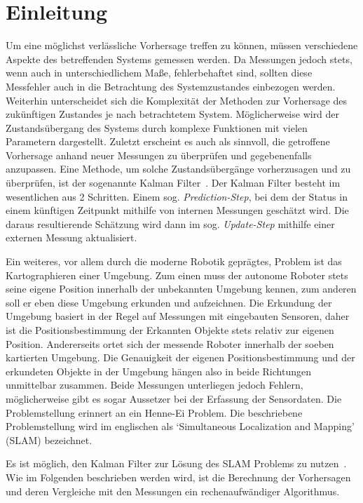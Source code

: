 \documentclass[11pt]{article}
\begin{document}
\section{Einleitung}\label{Einleitung}
Um eine möglichst verlässliche Vorhersage treffen zu können, müssen verschiedene Aspekte des betreffenden Systems gemessen werden. Da Messungen jedoch stets, wenn auch in unterschiedlichem Maße, fehlerbehaftet sind, sollten diese Messfehler auch in die Betrachtung des Systemzustandes einbezogen werden. Weiterhin unterscheidet sich die Komplexität der Methoden zur Vorhersage des zukünftigen Zustandes je nach betrachtetem System. Möglicherweise wird der Zustandsübergang des Systems durch komplexe Funktionen mit vielen Parametern dargestellt. Zuletzt erscheint es auch als sinnvoll, die getroffene Vorhersage anhand neuer Messungen zu überprüfen und gegebenenfalls anzupassen. Eine Methode, um solche Zustandsübergänge vorherzusagen und zu überprüfen, ist der sogenannte Kalman Filter~\cite{kalman1960new}. Der Kalman Filter besteht im wesentlichen aus 2 Schritten. Einem sog. \textit{Prediction-Step}, bei dem der Status in einem künftigen Zeitpunkt mithilfe von internen Messungen geschätzt wird. Die daraus resultierende Schätzung wird dann im sog. \textit{Update-Step} mithilfe einer externen Messung aktualisiert.

Ein weiteres, vor allem durch die moderne Robotik geprägtes, Problem ist das Kartographieren einer Umgebung. Zum einen muss der autonome Roboter stets seine eigene Position innerhalb der unbekannten Umgebung kennen, zum anderen soll er eben diese Umgebung erkunden und aufzeichnen. Die Erkundung der Umgebung basiert in der Regel auf Messungen mit eingebauten Sensoren, daher ist die Positionsbestimmung der Erkannten Objekte stets relativ zur eigenen Position. Andererseits ortet sich der messende Roboter innerhalb der soeben kartierten Umgebung. Die Genauigkeit der eigenen Positionsbestimmung und der erkundeten Objekte in der Umgebung hängen also in beide Richtungen unmittelbar zusammen. Beide Messungen unterliegen jedoch Fehlern, möglicherweise gibt es sogar Aussetzer bei der Erfassung der Sensordaten. Die Problemstellung erinnert an ein Henne-Ei Problem. Die beschriebene Problemstellung wird im englischen als ‘Simultaneous Localization and Mapping’ (SLAM) bezeichnet.

Es ist möglich, den Kalman Filter zur Lösung des SLAM Problems zu nutzen~\cite{freiburg_SLAM}. Wie im Folgenden beschrieben werden wird, ist die Berechnung der Vorhersagen und deren Vergleiche mit den Messungen ein rech\-en\-auf\-wän\-di\-ger Algorithmus.
\end{document}
